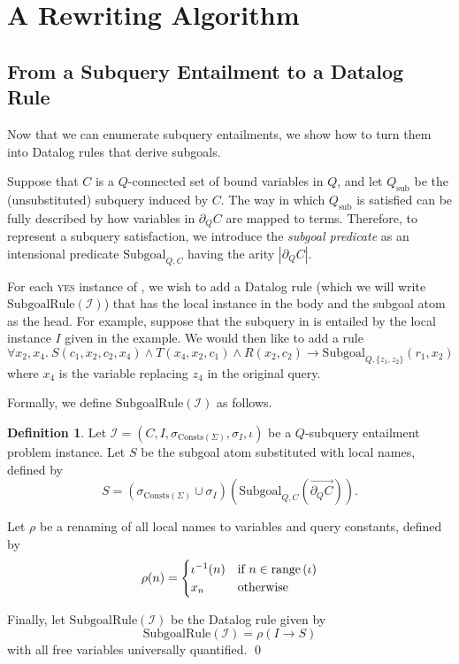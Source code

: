 \documentclass[12pt]{report}
\theoremstyle{plain}
\theoremstyle{definition}
\newtheorem{definition}[theorem]{Definition}
\def\Consts{{\mathrm{Consts}}}
\newcommand{\range}[1]{\ensuremath{\normalfont{\operatorname{range}} \left( #1 \right)}}
\begin{document}
\section{A Rewriting Algorithm}
\label{a-rewriting-algorithm}

\subsection{From a Subquery Entailment to a Datalog Rule}
\label{subquery-entailment-to-datalog-rule}

Now that we can enumerate subquery entailments, we show how to turn them into Datalog rules that derive subgoals.

Suppose that $C$ is a $Q$-connected set of bound variables in $Q$, and let $Q_\mathrm{sub}$ be the (unsubstituted) subquery induced by $C$. The way in which $Q_\mathrm{sub}$ is satisfied can be fully described by how variables in $\partial_Q C$ are mapped to terms. Therefore, to represent a subquery satisfaction, we introduce the \emph{subgoal predicate} as an intensional predicate $\mathrm{Subgoal}_{Q, C}$ having the arity $|\partial_Q C|$.

For each \textsc{yes} instance of , we wish to add a Datalog rule (which we will write $\mathrm{SubgoalRule}(\mathcal{I})$) that has the local instance in the body and the subgoal atom as the head.
For example, suppose that the subquery in  is entailed by the local instance $I$ given in the example. We would then like to add a rule $$
  \forall x_2, x_4.\ S(c_1, x_2, c_2, x_4) \wedge T(x_4, x_2, c_1) \wedge R(x_2, c_2) \rightarrow \mathrm{Subgoal}_{Q, \{z_1, z_2\}}(r_1, x_2)
$$
where $x_4$ is the variable replacing $z_4$ in the original query.

Formally, we define $\mathrm{SubgoalRule}(\mathcal{I})$ as follows.

\begin{definition}
  Let $\mathcal{I} = (C, I, \sigma_{\Consts(\Sigma)}, \sigma_I, \iota)$ be a $Q$-subquery entailment problem instance. Let $S$ be the subgoal atom substituted with local names, defined by $$
    S = (\sigma_{\Consts(\Sigma)} \cup \sigma_I)\left(\mathrm{Subgoal}_{Q, C}\left(\overrightarrow{\partial_Q C}\right)\right).
  $$

  Let $\rho$ be a renaming of all local names to variables and query constants, defined by $$
    \rho(n) = \begin{cases}
      \iota^{-1}(n) & \text{if } n \in \range{\iota} \\
      x_n & \text{otherwise}
    \end{cases}
  $$

  Finally, let $\mathrm{SubgoalRule}(\mathcal{I})$ be the Datalog rule given by $$
    \mathrm{SubgoalRule}(\mathcal{I}) = \rho\left(I \rightarrow S\right)
  $$ with all free variables universally quantified.
  \qed
\end{definition}
\end{document}

